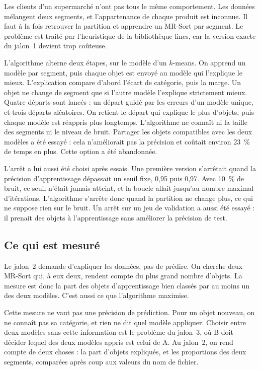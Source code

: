 \documentclass[11pt,a4paper]{article}
\begin{document}
Les clients d'un supermarché n'ont pas tous le même comportement. Les données mélangent deux segments, et l'appartenance de chaque produit est inconnue. Il faut à la fois retrouver la partition et apprendre un MR-Sort par segment. Le problème est traité par l'heuristique de la bibliothèque lincs, car la version exacte du jalon~1 devient trop coûteuse.

L'algorithme alterne deux étapes, sur le modèle d'un $k$-means. On apprend un modèle par segment, puis chaque objet est envoyé au modèle qui l'explique le mieux. L'explication compare d'abord l'écart de catégorie, puis la marge. Un objet ne change de segment que si l'autre modèle l'explique strictement mieux. Quatre départs sont lancés : un départ guidé par les erreurs d'un modèle unique, et trois départs aléatoires. On retient le départ qui explique le plus d'objets, puis chaque modèle est réappris plus longtemps. L'algorithme ne connaît ni la taille des segments ni le niveau de bruit. Partager les objets compatibles avec les deux modèles a été essayé : cela n'améliorait pas la précision et coûtait environ 23~\% de temps en plus. Cette option a été abandonnée.

L'arrêt a lui aussi été choisi après essais. Une première version s'arrêtait quand la précision d'apprentissage dépassait un seuil fixe, 0,95 puis 0,97. Avec 10~\% de bruit, ce seuil n'était jamais atteint, et la boucle allait jusqu'au nombre maximal d'itérations. L'algorithme s'arrête donc quand la partition ne change plus, ce qui ne suppose rien sur le bruit. Un arrêt sur un jeu de validation a aussi été essayé : il prenait des objets à l'apprentissage sans améliorer la précision de test.

\subsection*{Ce qui est mesuré}

Le jalon~2 demande d'expliquer les données, pas de prédire. On cherche deux MR-Sort qui, à eux deux, rendent compte du plus grand nombre d'objets. La mesure est donc la part des objets d'apprentissage bien classés par au moins un des deux modèles. C'est aussi ce que l'algorithme maximise.

Cette mesure ne vaut pas une précision de prédiction. Pour un objet nouveau, on ne connaît pas sa catégorie, et rien ne dit quel modèle appliquer. Choisir entre deux modèles sans cette information est le problème du jalon~3, où B doit décider lequel des deux modèles appris est celui de A. Au jalon~2, on rend compte de deux choses : la part d'objets expliqués, et les proportions des deux segments, comparées après coup aux valeurs du nom de fichier.
\end{document}
